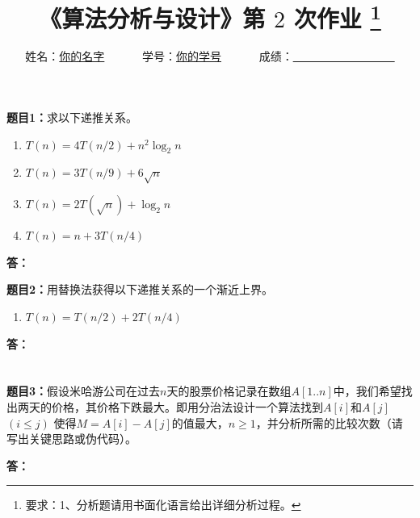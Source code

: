 \documentclass[12pt,a4paper]{article}
\begin{document}
\title{
  {\heiti《算法分析与设计》第 $2$ 次作业
    \footnote{要求：1、分析题请用书面化语言给出详细分析过程。}
    }
}
\date{}

\author{
姓名：\underline{你的名字}~~~~~~
学号：\underline{你的学号}~~~~~~
成绩：\underline{~~~~~~~~~~~~~~~~~~}
}

\maketitle

\noindent
\section*{\bf \color{red}{算法分析题}}

\noindent
{\bf 题目1：}求以下递推关系。
\begin{enumerate}
  \item[(1)]  $T(n)=4T(n/2)+n^2\log_{2}{n}$
  \item[(2)]  $T(n)=3T(n/9)+6\sqrt{n}$
  \item[(3)]  $T(n)=2T(\sqrt{n})+\log_{2}{n}$
  \item[(4)]  $T(n)=n+3T(n/4)$
\end{enumerate}

\vspace{5pt}
\noindent
{\bf 答：}


\vspace{10pt}
\noindent
{\bf 题目2：}用替换法获得以下递推关系的一个渐近上界。
\begin{enumerate}
	\item[(1)]  $T(n)=T(n/2)+2T(n/4)$
\end{enumerate}
\vspace{5pt}
\noindent
{\bf 答：}

\section*{\bf \color{red}{算法设计题}}
\vspace{10pt}
\noindent
{\bf 题目3：}假设米哈游公司在过去$n$天的股票价格记录在数组$A[1..n]$中，我们希望找出两天的价格，其价格下跌最大。即用分治法设计一个算法找到$A[i]$和$A[j]$$(i\leq j)$ 使得$M=A[i]-A[j]$的值最大，$n\geq1$，并分析所需的比较次数（请写出关键思路或伪代码）。

\vspace{5pt}
\noindent
{\bf 答：}
\end{document}
